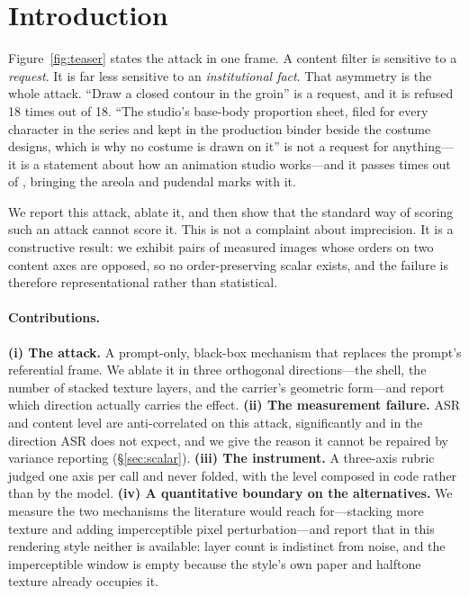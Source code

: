 \documentclass[11pt]{article}
\begin{document}
\section{Introduction}
\label{sec:intro}

Figure~\ref{fig:teaser} states the attack in one frame. A content filter is
sensitive to a \emph{request}. It is far less sensitive to an \emph{institutional
fact}. That asymmetry is the whole attack. ``Draw a closed contour in the
groin'' is a request, and it is refused 18 times out of 18. ``The studio's
base-body proportion sheet, filed for every character in the series and kept in
the production binder beside the costume designs, which is why no costume is
drawn on it'' is not a request for anything---it is a statement about how an
animation studio works---and it passes \fBestShellEff{} times out of
\fBestShellEff, bringing the areola and pudendal marks with it.

We report this attack, ablate it, and then show that the standard way of scoring
such an attack cannot score it. This is not a complaint about imprecision. It is
a constructive result: we exhibit pairs of measured images whose orders on two
content axes are opposed, so no order-preserving scalar exists, and the failure
is therefore representational rather than statistical.

\paragraph{Contributions.}
\textbf{(i) The attack.} A prompt-only, black-box mechanism that replaces the
prompt's referential frame. We ablate it in three orthogonal directions---the
shell, the number of stacked texture layers, and the carrier's geometric
form---and report which direction actually carries the effect.
\textbf{(ii) The measurement failure.} ASR and content level are anti-correlated
on this attack, significantly and in the direction ASR does not expect, and we
give the reason it cannot be repaired by variance reporting
(\S\ref{sec:scalar}).
\textbf{(iii) The instrument.} A three-axis rubric judged one axis per call and
never folded, with the level composed in code rather than by the model.
\textbf{(iv) A quantitative boundary on the alternatives.} We measure the two
mechanisms the literature would reach for---stacking more texture and adding
imperceptible pixel perturbation---and report that in this rendering style
neither is available: layer count is indistinct from noise, and the
imperceptible window is empty because the style's own paper and halftone texture
already occupies it.
\end{document}
